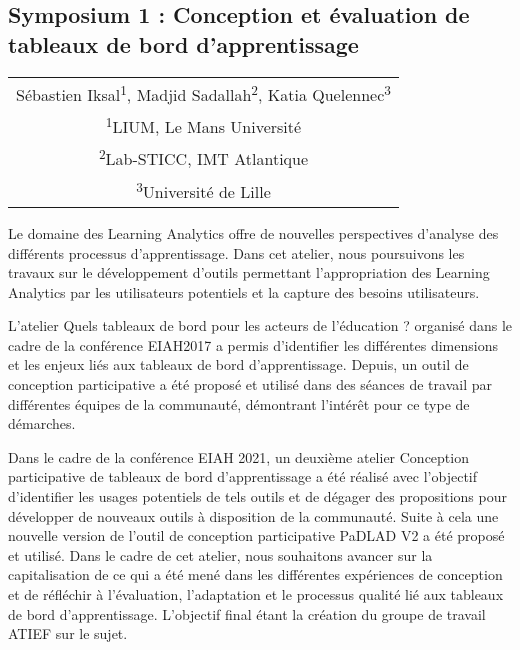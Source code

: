 \vspace*{2em}
\begin{center}
	\subsection{Symposium 1 : Conception et évaluation de tableaux de bord d’apprentissage}
\end{center}


\vspace{1em}
\begin{center}
	\begin{tabular}{@{}c@{}}
		Sébastien Iksal\textsuperscript{1}, Madjid Sadallah\textsuperscript{2}, Katia Quelennec\textsuperscript{3}\\
		\textsuperscript{1}LIUM, Le Mans Université\\
		\textsuperscript{2}Lab-STICC, IMT Atlantique\\
		\textsuperscript{3}Université de Lille
	\end{tabular}
\end{center}

\vspace{2em}

Le domaine des Learning Analytics offre de nouvelles perspectives d’analyse des différents processus d’apprentissage. Dans cet atelier, nous poursuivons les travaux sur le développement d’outils permettant l’appropriation des Learning Analytics par les utilisateurs potentiels et la capture des besoins utilisateurs.

L’atelier Quels tableaux de bord pour les acteurs de l’éducation ? organisé dans le cadre de la conférence EIAH2017 a permis d’identifier les différentes dimensions et les enjeux liés aux tableaux de bord d’apprentissage. Depuis, un outil de conception participative a été proposé et utilisé dans des séances de travail par différentes équipes de la communauté, démontrant l’intérêt pour ce type de démarches.

Dans le cadre de la conférence EIAH 2021, un deuxième atelier Conception participative de tableaux de bord d’apprentissage a été réalisé avec l’objectif d’identifier les usages potentiels de tels outils et de dégager des propositions pour développer de nouveaux outils à disposition de la communauté. Suite à cela une nouvelle version de l’outil de conception participative PaDLAD V2 a été proposé et utilisé. Dans le cadre de cet atelier, nous souhaitons avancer sur la capitalisation de ce qui a été mené dans les différentes expériences de conception et de réfléchir à l’évaluation, l’adaptation et le processus qualité lié aux tableaux de bord d’apprentissage. L’objectif final étant la création du groupe de travail ATIEF sur le sujet.

